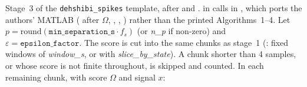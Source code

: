 Stage~3 of the \texttt{dehshibi\_spikes} template, after 
and .  in
 calls  in
, which ports the authors' MATLAB
( after $\Omega$, , ,
) rather than the printed Algorithms~1--4. Let $p =
\mathrm{round}(\texttt{min\_separation\_s}\cdot f_s)$ (or \emph{n\_p} if non-zero) and
$\varepsilon = \texttt{epsilon\_factor}$. The score is cut into the same chunks as stage~1
(: fixed windows of \emph{window\_s}, or  with
\emph{slice\_by\_state}). A chunk shorter than 4 samples, or whose score is not finite
throughout, is skipped and counted. In each remaining chunk, with score $\Omega$ and signal $x$:

